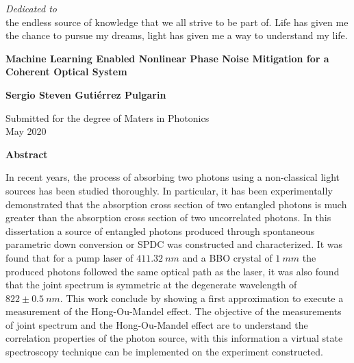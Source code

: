 \newpage
{}

\thispagestyle{empty}
\begin{center}
 \vspace*{2cm}
  \textit{\LARGE {Dedicated to}}\\ 
the endless source of knowledge that we all strive to be part of. Life has given me the chance to pursue my dreams, light has given me a way to understand my life. 



\end{center}


\newpage
\thispagestyle{empty}
\begin{center}
  \textbf{\large Machine Learning Enabled Nonlinear Phase Noise Mitigation for a Coherent Optical System}

  \vspace*{1cm}
  \textbf{\normalsize Sergio Steven Guti\'errez Pulgarin}

  \vspace*{0.5cm}
  {\normalsize Submitted for the degree of Maters in Photonics\\ May 2020}

  \vspace*{1cm}
  \textbf{\large Abstract}
\end{center}

In recent years, the process of absorbing two photons using a non-classical light sources has been studied thoroughly. In particular, it has been experimentally demonstrated that the absorption cross section of two entangled photons is much greater than the absorption cross section of two uncorrelated photons. In this dissertation a source of entangled photons produced through spontaneous parametric down conversion or SPDC was constructed and characterized. It was found that for a pump laser of $411.32~nm$ and a BBO crystal of $1~mm$ the produced photons followed the same optical path as the laser, it was also found that the joint spectrum is symmetric at the degenerate wavelength of $822\pm0.5~nm$. This work conclude by showing a first approximation to execute a measurement of the Hong-Ou-Mandel effect. The objective of the measurements of joint spectrum and the Hong-Ou-Mandel effect are to understand the correlation properties of the photon source, with this information a virtual state spectroscopy technique can be implemented on the experiment constructed. 


